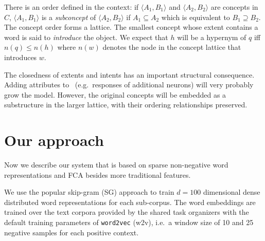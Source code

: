 \documentclass[11pt,a4paper]{article}
\begin{document}
There is an order defined in the context:
if $\langle A_1 , B_1 \rangle$ and $\langle A_2 , B_2 \rangle$ are concepts in
$C$, $\langle A_1 , B_1 \rangle$ is a \emph{subconcept} of $\langle A_2 , B_2
\rangle$ if $A_1 \subseteq A_2 $ which is equivalent to $B_1 \supseteq B_2 $.  
The concept order forms a %
lattice.
The smallest concept whose extent contains a word is said to
\emph{introduce} the object.
We expect that $h$ will be a hypernym of $q$ iff $n(q)\le n(h)$ where $n(w)$
denotes the node in the concept lattice that introduces $w$.

The closedness of extents and intents has an important structural consequence. 
Adding attributes to \at~(e.g.~responses of
additional neurons) will very probably grow the model.  However, the original
concepts will be embedded as a substructure in the larger lattice, with their
ordering relationships preserved.

\section{Our approach}

Now we describe our system that is based on sparse non-negative word
representations and FCA besides more traditional features.


We use the popular skip-gram (SG) %
approach \citep{Mikolov:2013f} to train $d=100$ dimensional dense distributed
word representations for each sub-corpus. The word embeddings are trained over 
the text corpora provided by the shared task organizers with the default 
training parameters of \texttt{word2vec} (w2v), i.e.~a window size of 10 and 
25 negative samples for each positive context.
\end{document}
